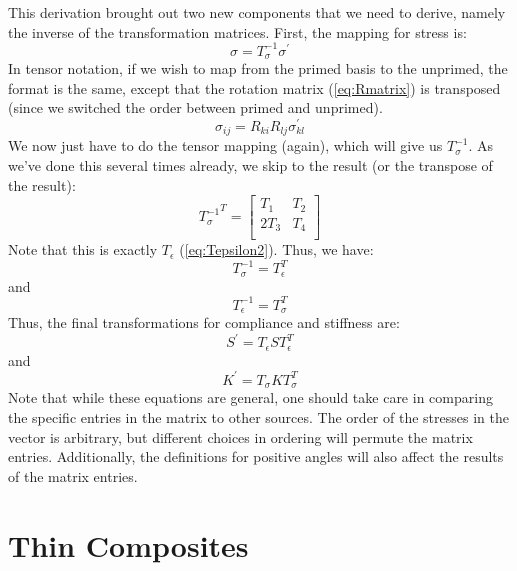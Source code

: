 \documentclass{article}
\begin{document}
This derivation brought out two new components that we need to derive, namely the inverse of the transformation matrices. First, the mapping for stress is:
\begin{equation}
\sigma = T_\sigma^{-1} \sigma^\prime
\label{eq:stressmapping}
\end{equation}
In tensor notation, if we wish to map from the primed basis to the unprimed, the format is the same, except that the rotation matrix (\cref{eq:Rmatrix}) is transposed (since we switched the order between primed and unprimed).
\begin{equation}
\sigma_{ij} = R_{ki} R_{lj} \sigma^\prime_{kl}
\end{equation}
We now just have to do the tensor mapping (again), which will give us $T_\sigma^{-1}$.  As we've done this several times already, we skip to the result (or the transpose of the result):
\begin{equation}
{T_\sigma^{-1}}^T =
\begin{bmatrix}
    T_1 & T_2 \\
    2 T_3 & T_4 \\
\end{bmatrix}
\end{equation}
Note that this is exactly $T_\epsilon$ (\cref{eq:Tepsilon2}).
Thus, we have:
\begin{equation}
T_\sigma^{-1} = T_\epsilon^T
\end{equation}
and
\begin{equation}
T_\epsilon^{-1} = T_\sigma^T
\end{equation}
Thus, the final transformations for compliance and stiffness are:
\begin{equation}
S^\prime = T_\epsilon S T_\epsilon^T
\end{equation}
and
\begin{equation}
K^\prime = T_\sigma K T_\sigma^T
\label{eq:Ktrans}
\end{equation}
Note that while these equations are general, one should take care in comparing the specific entries in the matrix to other sources.  The order of the stresses in the vector is arbitrary, but different choices in ordering will permute the matrix entries.  Additionally, the definitions for positive angles will also affect the results of the matrix entries.

\section{Thin Composites}
\end{document}
